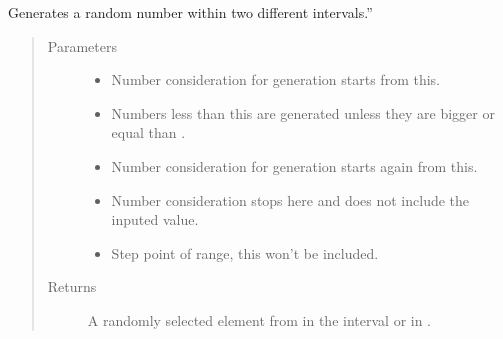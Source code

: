 \documentclass[letterpaper,10pt,english]{sphinxmanual}
\begin{document}
\begin{fulllineitems}
\label{\detokenize{app.utils:app.utils.randoms.excluding_randrange}}
Generates a random number within two different intervals.”
\begin{quote}\begin{description}
\item[{Parameters}] \leavevmode\begin{itemize}
\item {} 
 \textendash{} Number consideration for generation starts from this.

\item {} 
 \textendash{} Numbers less than this are generated unless they are bigger or
equal than .

\item {} 
 \textendash{} Number consideration for generation starts again from this.

\item {} 
 \textendash{} Number consideration stops here and does not include the inputed
value.

\item {} 
 \textendash{} Step point of range, this won’t be included.

\end{itemize}

\item[{Returns}] \leavevmode
A randomly selected element from in the interval \sphinxcode{\sphinxupquote{{[}start, stop)}} or in
\sphinxcode{\sphinxupquote{{[}start\_again, stop\_again)}}.

\end{description}\end{quote}

\end{fulllineitems}

\end{document}

